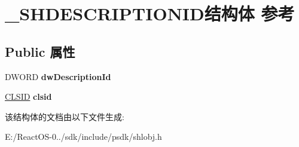 \hypertarget{struct___s_h_d_e_s_c_r_i_p_t_i_o_n_i_d}{}\section{\+\_\+\+S\+H\+D\+E\+S\+C\+R\+I\+P\+T\+I\+O\+N\+I\+D结构体 参考}
\label{struct___s_h_d_e_s_c_r_i_p_t_i_o_n_i_d}
\subsection*{Public 属性}
\begin{DoxyCompactItemize}
\item 
\mbox{\label{struct___s_h_d_e_s_c_r_i_p_t_i_o_n_i_d_afac6f147252ca57aa441be20fb50f99f}} 
D\+W\+O\+RD {\bfseries dw\+Description\+Id}
\item 
\mbox{\label{struct___s_h_d_e_s_c_r_i_p_t_i_o_n_i_d_acd53d52944f2b14946212fa88d362c29}} 
\hyperlink{struct___i_i_d}{C\+L\+S\+ID} {\bfseries clsid}
\end{DoxyCompactItemize}


该结构体的文档由以下文件生成\+:\begin{DoxyCompactItemize}
\item 
E\+:/\+React\+O\+S-\/0../sdk/include/psdk/shlobj.\+h\end{DoxyCompactItemize}
